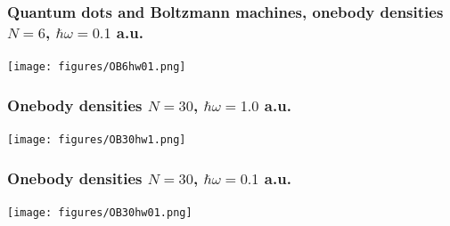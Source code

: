 \documentclass{beamer}
\begin{document}
\begin{frame}
\frametitle{Quantum dots and Boltzmann machines, onebody densities $N=6$, $\hbar\omega=0.1$ a.u.}

\begin{block}{}

\vspace{6mm}

\centerline{\texttt{[image: figures/OB6hw01.png]}}

\vspace{6mm}

\end{block}
\end{frame}

\begin{frame}
\frametitle{Onebody densities $N=30$, $\hbar\omega=1.0$ a.u.}

\begin{block}{}

\vspace{6mm}

\centerline{\texttt{[image: figures/OB30hw1.png]}}

\vspace{6mm}

\end{block}
\end{frame}

\begin{frame}
\frametitle{Onebody densities $N=30$, $\hbar\omega=0.1$ a.u.}

\begin{block}{}

\vspace{6mm}

\centerline{\texttt{[image: figures/OB30hw01.png]}}

\vspace{6mm}

\end{block}
\end{frame}
\end{document}
